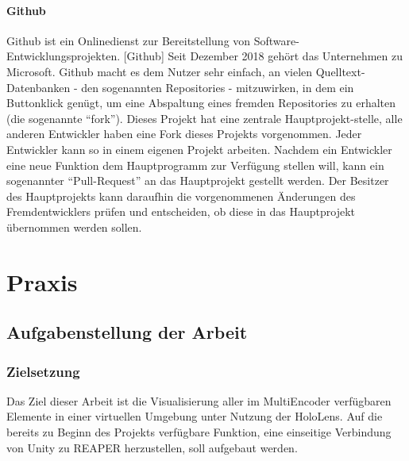 \documentclass[11pt, titlepage, fleqn]{report}
\begin{document}
                \subsubsection{Github}
                    Github ist ein Onlinedienst zur Bereitstellung von Software- Entwicklungsprojekten. [Github] Seit Dezember 2018 gehört das 
                    Unternehmen zu Microsoft. Github macht es dem Nutzer sehr einfach, an vielen Quelltext-Datenbanken - den sogenannten 
                    Repositories - mitzuwirken, in dem ein Buttonklick genügt, um eine Abspaltung eines fremden Repositories zu erhalten 
                    (die sogenannte “fork”).
                    Dieses Projekt hat eine zentrale Hauptprojekt-stelle, alle anderen Entwickler haben eine Fork dieses Projekts vorgenommen.
                    Jeder Entwickler kann so in einem eigenen Projekt arbeiten.
                    Nachdem ein Entwickler eine neue Funktion dem Hauptprogramm zur Verfügung stellen will, kann ein sogenannter “Pull-Request” 
                    an das Hauptprojekt gestellt werden. Der Besitzer des Hauptprojekts kann daraufhin die vorgenommenen Änderungen des Fremdentwicklers 
                    prüfen und entscheiden, ob diese in das Hauptprojekt übernommen werden sollen.
    \chapter{Praxis}%
    \label{sec:Praxis}                
        \section{Aufgabenstellung der Arbeit}
        \label{sec:3.1}
            \subsection*{Zielsetzung}
                Das Ziel dieser Arbeit ist die Visualisierung aller im MultiEncoder verfügbaren Elemente in einer virtuellen 
                Umgebung unter Nutzung der HoloLens. Auf die bereits zu Beginn des Projekts verfügbare Funktion, eine einseitige 
                Verbindung von Unity zu REAPER herzustellen, soll aufgebaut werden.
\end{document}
